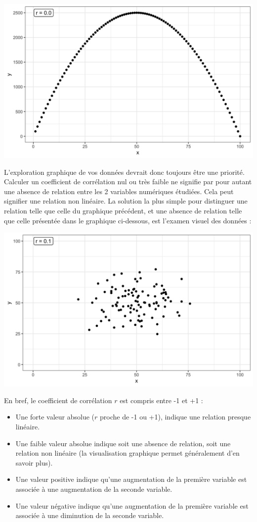 \documentclass[a4paperpaper,]{article}
\providecommand{\tightlist}{%
  \setlength{\itemsep}{0pt}\setlength{\parskip}{0pt}}
\begin{document}
\begin{center}\includegraphics[width=0.9\linewidth]{figure/unnamed-chunk-97-1} \end{center}

L'exploration graphique de vos données devrait donc toujours être une priorité. Calculer un coefficient de corrélation nul ou très faible ne signifie par pour autant une absence de relation entre les 2 variables numériques étudiées. Cela peut signifier une relation non linéaire. La solution la plus simple pour distinguer une relation telle que celle du graphique précédent, et une absence de relation telle que celle présentée dans le graphique ci-dessous, est l'examen visuel des données :

\begin{center}\includegraphics[width=0.9\linewidth]{figure/unnamed-chunk-98-1} \end{center}

En bref, le coefficient de corrélation \(r\) est compris entre -1 et +1 :

\begin{itemize}
\tightlist
\item
  Une forte valeur absolue (\(r\) proche de -1 ou +1), indique une relation presque linéaire.
\item
  Une faible valeur absolue indique soit une absence de relation, soit une relation non linéaire (la visualisation graphique permet généralement d'en savoir plus).
\item
  Une valeur positive indique qu'une augmentation de la première variable est associée à une augmentation de la seconde variable.
\item
  Une valeur négative indique qu'une augmentation de la première variable est associée à une diminution de la seconde variable.
\end{itemize}
\end{document}
